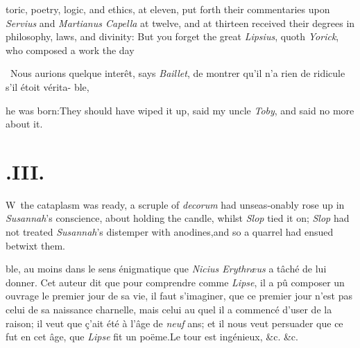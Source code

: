 \documentclass{article}
\begin{document}
toric, poetry, logic, and ethics, at eleven,\break
\tsk put forth their commentaries upon\break
\textit{Servius} and \textit{Martianus Capella} at twelve,\break
\tsk and at thirteen received their degrees in
philosophy, laws, and divinity:\tsh\break
But you forget the great \textit{Lipsius}, quoth
\textit{Yorick}, who composed a work \lower -2pt\hbox{\ast} the day\break
{}

\vfill
\bgroup\footnotesize
\indent\fnast\ Nous aurions quelque interêt, says
\textit{Baillet}, de montrer qu’il n’a rien de ridicule s’il étoit vérita-
\break\null\hfill ble,\par\egroup

\eject\noindent
he was born:\tsh They should have wiped it up, said my uncle
\textit{Toby}, and said no more about it.

\section{.\enspace III.}

\lettrine{W}{\,} the cataplasm was ready, a\break
scruple of \textit{decorum} had unseas-\break onably rose up in
\textit{Susannah}’s conscience, about holding the candle,
whilst \textit{Slop} tied it on; \textit{Slop} had not treated
\textit{Susannah}’s distemper with anodines,\tsk and so a
quarrel had ensued betwixt them.

\vfill
\bgroup\footnotesize
\noindent
ble, au
moins dans le sens énigmatique que \textit{Nicius Erythræus} a tâché de lui donner.
Cet auteur dit que pour comprendre comme \textit{Lipse}, il a pû composer un ouvrage
le premier jour de sa vie, il faut s’imaginer, que ce premier jour n’est pas celui
de sa naissance charnelle, mais celui au quel il a commencé d’user de la raison; il
veut que ç’ait été à l’âge de \textit{neuf} ans; et il nous veut persuader que ce
fut en cet âge, que \textit{Lipse} fit un poëme.\tsh Le tour est ingénieux, \&c.
\&c.\par\egroup
{}
\eject
\end{document}
